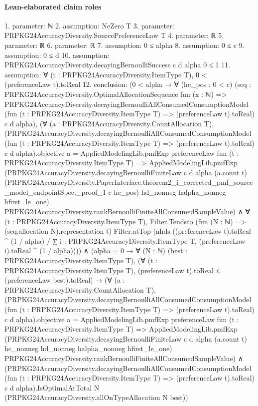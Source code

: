 \documentclass[10pt]{article}
\begin{document}
\paragraph{Lean-elaborated claim roles}\begin{ReviewVerbatim}
1. parameter: ℕ
2. assumption: NeZero T
3. parameter: PRPKG24AccuracyDiversity.SourcePreferenceLaw T
4. parameter: ℝ
5. parameter: ℝ
6. parameter: ℝ
7. assumption: 0 ≤ alpha
8. assumption: 0 ≤ c
9. assumption: 0 ≤ d
10. assumption: PRPKG24AccuracyDiversity.decayingBernoulliSuccess c d alpha 0 ≤ 1
11. assumption: ∀ (t : PRPKG24AccuracyDiversity.ItemType T), 0 < (preferenceLaw t).toReal
12. conclusion: (0 < alpha →
    ∀ (hc_pos : 0 < c)
      (seq :
        PRPKG24AccuracyDiversity.OptimalAllocationSequence fun (x : ℕ) =>
          PRPKG24AccuracyDiversity.decayingBernoulliAllConsumedConsumptionModel
            (fun (t : PRPKG24AccuracyDiversity.ItemType T) => (preferenceLaw t).toReal) c d alpha),
      (∀ (a : PRPKG24AccuracyDiversity.CountAllocation T),
          (PRPKG24AccuracyDiversity.decayingBernoulliAllConsumedConsumptionModel
                  (fun (t : PRPKG24AccuracyDiversity.ItemType T) => (preferenceLaw t).toReal) c d alpha).objective
              a =
            AppliedModelingLib.pmfExp preferenceLaw fun (t : PRPKG24AccuracyDiversity.ItemType T) =>
              AppliedModelingLib.pmfExp
                (PRPKG24AccuracyDiversity.decayingBernoulliFiniteLaw c d alpha (a.count t)
                  (PRPKG24AccuracyDiversity.PaperInterface.theorem2_i_corrected_pmf_source_model_endpointSpec._proof_1 c
                    hc_pos)
                  hd_nonneg halpha_nonneg hfirst_le_one)
                PRPKG24AccuracyDiversity.rankBernoulliFiniteAllConsumedSampleValue) ∧
        ∀ (t : PRPKG24AccuracyDiversity.ItemType T),
          Filter.Tendsto (fun (N : ℕ) => (seq.allocation N).representation t) Filter.atTop
            (nhds
              ((preferenceLaw t).toReal ^ (1 / alpha) /
                ∑ i : PRPKG24AccuracyDiversity.ItemType T, (preferenceLaw i).toReal ^ (1 / alpha)))) ∧
  (alpha = 0 →
    ∀ (N : ℕ) (best : PRPKG24AccuracyDiversity.ItemType T),
      (∀ (t : PRPKG24AccuracyDiversity.ItemType T), (preferenceLaw t).toReal ≤ (preferenceLaw best).toReal) →
        (∀ (a : PRPKG24AccuracyDiversity.CountAllocation T),
            (PRPKG24AccuracyDiversity.decayingBernoulliAllConsumedConsumptionModel
                    (fun (t : PRPKG24AccuracyDiversity.ItemType T) => (preferenceLaw t).toReal) c d alpha).objective
                a =
              AppliedModelingLib.pmfExp preferenceLaw fun (t : PRPKG24AccuracyDiversity.ItemType T) =>
                AppliedModelingLib.pmfExp
                  (PRPKG24AccuracyDiversity.decayingBernoulliFiniteLaw c d alpha (a.count t) hc_nonneg hd_nonneg
                    halpha_nonneg hfirst_le_one)
                  PRPKG24AccuracyDiversity.rankBernoulliFiniteAllConsumedSampleValue) ∧
          (PRPKG24AccuracyDiversity.decayingBernoulliAllConsumedConsumptionModel
                (fun (t : PRPKG24AccuracyDiversity.ItemType T) => (preferenceLaw t).toReal) c d alpha).IsOptimalAtTotal
            N (PRPKG24AccuracyDiversity.allOnTypeAllocation N best))
\end{ReviewVerbatim}
\end{document}
